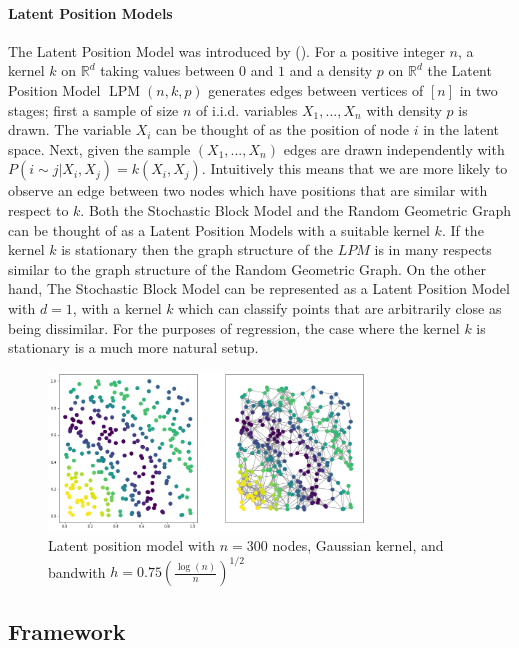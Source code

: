 \documentclass{article}
\DeclareMathOperator{\LPM}{LPM}
\begin{document}
\paragraph{Latent Position Models} The Latent Position Model was introduced by (\cite{Hoff}).
For a positive integer $n$, a  kernel $k$ on $\mathbb{R}^d$ taking values between $0$ and $1$ and a density $p$ on $\mathbb{R}^d$ the Latent Position Model $\LPM(n,k,p)$ generates edges between vertices of $[n]$ in two stages; first a sample of size $n$ of i.i.d. variables $X_1,...,X_n$ with density $p$ is drawn. The variable $X_i$ can be thought of as the position of node $i$ in the latent space. Next, given the sample $(X_1,...,X_n)$ edges are drawn independently with $P(i\sim j|X_i,X_j)=k(X_i,X_j)$. Intuitively this means that we are more likely to observe an edge between two nodes which have positions that are similar with respect to $k$. Both the Stochastic Block Model and the Random Geometric Graph can be thought of as a Latent Position Models with a suitable kernel $k$. If the kernel $k$ is stationary then the graph structure of the $LPM$ is in many respects similar to the graph structure of the Random Geometric Graph. On the other hand, The Stochastic Block Model can be represented as a Latent Position Model with $d=1$, with a kernel $k$ which can classify points that are arbitrarily close as being dissimilar. For the purposes of regression, the case where the kernel $k$ is stationary is a much more natural setup.

\begin{figure}[h!]
    \centering
    \includegraphics[width=0.75\textwidth]{lpm_image_correct.png}
    \caption{Latent position model with $n=300$ nodes, Gaussian kernel, and bandwith $h=0.75(\frac{\log(n)}{n})^{1/2}$}
    \label{fig:LPM_plot}
\end{figure}



\subsection{Framework}
\end{document}
